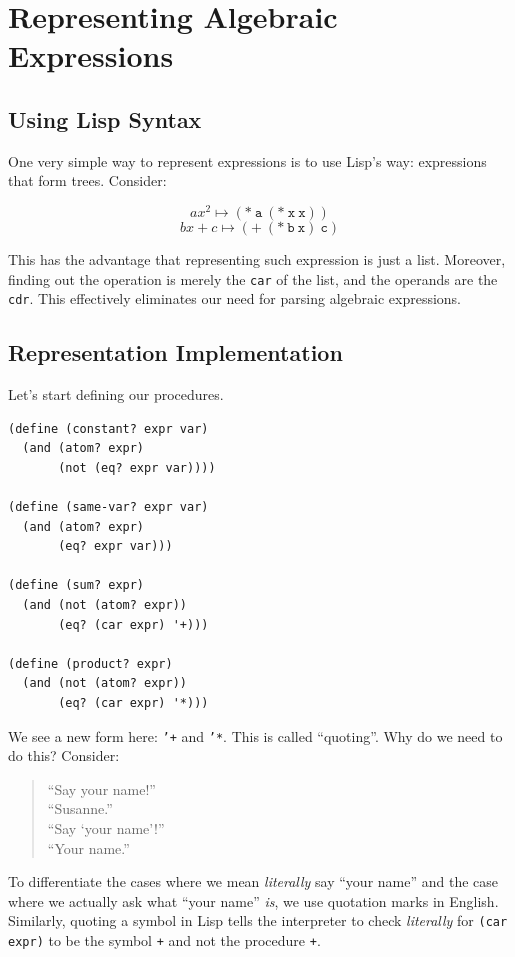 \documentclass[9pt]{report}
\begin{document}
\section{Representing Algebraic Expressions}
\label{sec:org440d440}

\subsection{Using Lisp Syntax}
\label{sec:orgee7b7fb}

One very simple way to represent expressions is to use Lisp's way:
expressions that form trees. Consider:

$$ax^{2} \mapsto \mathtt{(*~a~(*~x~x))}$$ $$bx+c \mapsto \mathtt{(
    \mathtt{+} ~(*~b~x)~c)}$$

This has the advantage that representing such expression is just a
list. Moreover, finding out the operation is merely the \texttt{car} of
the list, and the operands are the \texttt{cdr}. This effectively
eliminates our need for parsing algebraic expressions.

\subsection{Representation Implementation}
\label{sec:org4d0a9be}

Let's start defining our procedures.

\begin{verbatim}
(define (constant? expr var)
  (and (atom? expr)
       (not (eq? expr var))))

(define (same-var? expr var)
  (and (atom? expr)
       (eq? expr var)))

(define (sum? expr)
  (and (not (atom? expr))
       (eq? (car expr) '+)))

(define (product? expr)
  (and (not (atom? expr))
       (eq? (car expr) '*)))
\end{verbatim}

We see a new form here: \texttt{'+} and \texttt{'*}. This is called ``quoting''.
Why do we need to do this? Consider:

\begin{verse}
``Say your name!''\\
``Susanne.''\\
``Say `your name'!''\\
``Your name.''\\
\end{verse}

To differentiate the cases where we mean \emph{literally} say ``your
name'' and the case where we actually ask what ``your name'' \emph{is}, we
use quotation marks in English. Similarly, quoting a symbol in
Lisp tells the interpreter to check \emph{literally} for \texttt{(car expr)}
to be the symbol \texttt{+} and not the procedure \texttt{+}.
\end{document}
